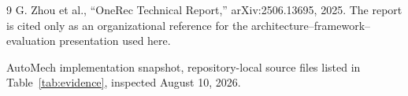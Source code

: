 \documentclass[10pt]{article}
\begin{document}
\begin{thebibliography}{9}
G. Zhou et al., ``OneRec Technical Report,'' arXiv:2506.13695, 2025.
The report is cited only as an organizational reference for the architecture--framework--
evaluation presentation used here.

AutoMech implementation snapshot, repository-local source files listed in
Table~\ref{tab:evidence}, inspected August 10, 2026.
\end{thebibliography}
\end{document}
